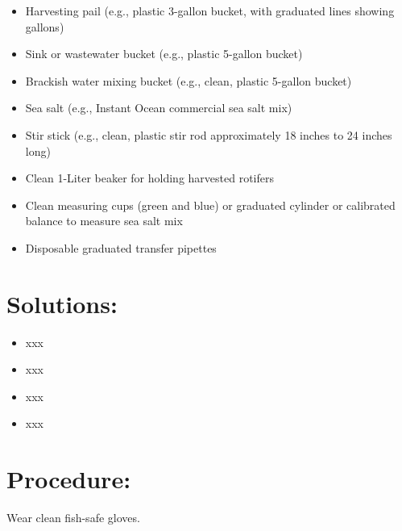 \documentclass[
  letterpaper,
  DIV=11,
  numbers=noendperiod]{scrreprt}
\providecommand{\tightlist}{%
  \setlength{\itemsep}{0pt}\setlength{\parskip}{0pt}}\usepackage{longtable,booktabs,array}
\begin{document}
\begin{itemize}
\begin{tcolorbox}
  \end{tcolorbox}
\item
  Harvesting pail (e.g., plastic 3-gallon bucket, with graduated lines
  showing gallons)
\item
  Sink or wastewater bucket (e.g., plastic 5-gallon bucket)
\item
  Brackish water mixing bucket (e.g., clean, plastic 5-gallon bucket)
\item
  Sea salt (e.g., Instant Ocean commercial sea salt mix)
\item
  Stir stick (e.g., clean, plastic stir rod approximately 18 inches to
  24 inches long)
\item
  Clean 1-Liter beaker for holding harvested rotifers
\item
  Clean measuring cups (green and blue) or graduated cylinder or
  calibrated balance to measure sea salt mix
\item
  Disposable graduated transfer pipettes
\end{itemize}

\hypertarget{solutions-35}{%
\section{Solutions:}\label{solutions-35}}

\begin{itemize}
\tightlist
\item
  xxx
\item
  xxx
\item
  xxx
\item
  xxx
\end{itemize}

\hypertarget{procedure-45}{%
\section{Procedure:}\label{procedure-45}}

\begin{tcolorbox}[enhanced jigsaw, toprule=.15mm, breakable, coltitle=black, leftrule=.75mm, title=\textcolor{quarto-callout-warning-color}{\faExclamationTriangle}\hspace{0.5em}{NOTES}, bottomrule=.15mm, toptitle=1mm, bottomtitle=1mm, colframe=quarto-callout-warning-color-frame, opacityback=0, colback=white, opacitybacktitle=0.6, colbacktitle=quarto-callout-warning-color!10!white, rightrule=.15mm, titlerule=0mm, arc=.35mm, left=2mm]

Wear clean fish-safe gloves.

\end{tcolorbox}
\end{document}
